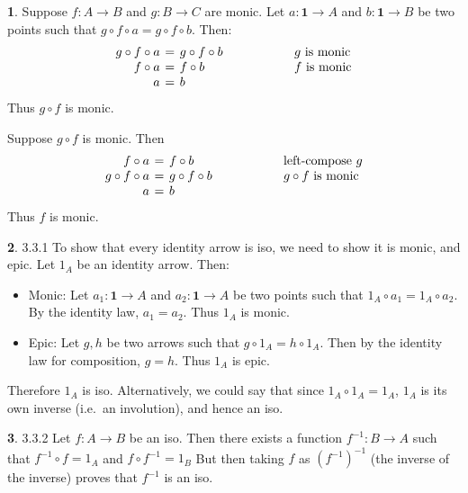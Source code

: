 \documentclass{article}
\theoremstyle{definition}
\newcommand{\point}[1]{\mathbf{1} \to #1}
\theoremstyle{definition}
\theoremstyle{definition}
\newtheorem{solution-internal}{}[subsection]
\newenvironment{solution}{
  \begin{solution-internal}
}{
  \end{solution-internal}
}
\begin{document}
\begin{solution}
  Suppose $f\colon A \to B$ and $g\colon B \to C$ are monic. Let $a\colon
  \mathbf{1} \to A$ and $b\colon \mathbf{1} \to B$ be two points
  such that $g \circ f \circ a = g \circ f \circ b$. Then:
  \[
    \arraycolsep=2pt
    \begin{array}{rcl@{\hspace{2cm}}l}
      g \circ f \circ a &=& g \circ f \circ b & \text{$g$ is monic}\\
      f \circ a &=& f \circ b & \text{$f$ is monic}\\
      a &=& b & \\
  \end{array}
  \]
  Thus $g \circ f$ is monic.

  Suppose $g \circ f$ is monic. Then
  \[
    \arraycolsep=2pt
    \begin{array}{rcl@{\hspace{2cm}}l}
      f \circ a &=& f \circ b & \text{left-compose $g$}\\
      g \circ f \circ a &=& g \circ f \circ b & \text{$g \circ f$ is monic}\\
      a &=& b & \\
  \end{array}
  \]
  Thus $f$ is monic.

\end{solution}
\begin{solution}
3.3.1 To show that every identity arrow is iso, we need to show it is monic,
and epic. Let $1_A$ be an identity arrow. Then:
\begin{itemize}
  \item Monic: Let $a_1 \colon \point{A}$ and $a_2 \colon \point{A}$ be two points
    such that $1_A \circ a_1 = 1_A \circ a_2$. By the identity law, $a_1 =
    a_2$. Thus $1_A$ is monic.
  \item Epic: Let $g, h$ be two arrows such that $g \circ 1_A = h \circ 1_A$.
    Then by the identity law for composition, $g = h$. Thus $1_A$ is epic.
\end{itemize}
Therefore $1_A$ is iso. Alternatively, we could say that since $1_A \circ 1_A
= 1_A$, $1_A$ is its own inverse (i.e.\ an involution), and hence an iso.
\end{solution}

\begin{solution}
  3.3.2
  Let $f\colon A \to B$ be an iso. Then there exists a function $f^{-1}\colon
  B \to A$ such that $f^{-1} \circ f = 1_A$ and $f \circ f^{-1} = 1_B$ But
  then taking $f$ as ${(f^{-1})}^{-1}$ (the inverse of the inverse) proves
  that $f^{-1}$ is an iso.
\end{solution}
\end{document}
